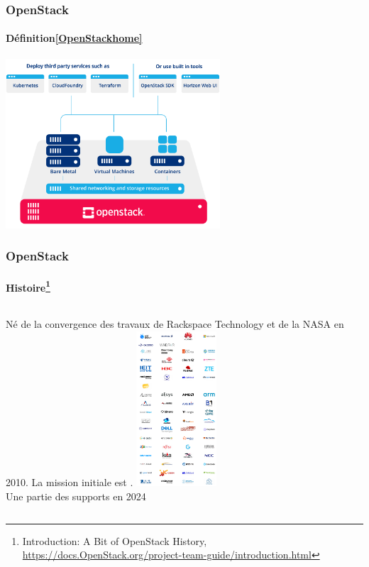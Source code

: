 \documentclass{beamer}
\begin{document}
    \begin{frame}
        \transdissolve
        \frametitle{OpenStack}
        \framesubtitle{Définition\cref{OpenStackhome}}
        \bigbreak
        \centering
        \includegraphics[width=8cm]{image/openstack-overview}
    \end{frame}

    \begin{frame}
        \transdissolve
        \frametitle{OpenStack}
        \framesubtitle{Histoire\footnote{Introduction: A Bit of OpenStack History, \url{https://docs.OpenStack.org/project-team-guide/introduction.html}}}

        \begin{columns}
            Né de la convergence des travaux de Rackspace Technology et de la NASA en 2010.
            \bigbreak
            La mission initiale est .
            \centering
            \includegraphics[width=3cm]{image/openstack-supports} \\ \tiny{Une partie des supports en 2024}\\
        \end{columns}
    \end{frame}
\end{document}

